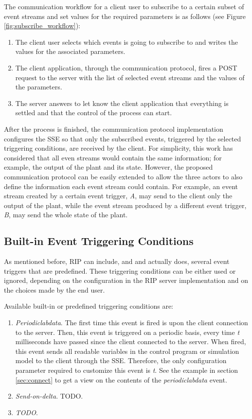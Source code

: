 The communication workflow for a client user to subscribe to a certain subset of event streams and set values for the required parameters is as follows (see Figure \ref{fig:subscribe_workflow}):

\begin{enumerate}
	\item The client user selects which events is going to subscribe to and writes the values for the associated parameters. 
	\item The client application, through the communication protocol, fires a POST request to the server with the list of selected event streams and the values of the parameters.
	\item The server answers to let know the client application that everything is settled and that the control of the process can start.
\end{enumerate}

After the process is finished, the communication protocol implementation configures the SSE so that only the subscribed events, triggered by the selected triggering conditions, are received by the client. For simplicity, this work has considered that all even streams would contain the same information; for example, the output of the plant and its state. However, the proposed communication protocol can be easily extended to allow the three actors to also define the information each event stream could contain. For example, an event stream created by a certain event trigger, \textit{A}, may send to the client only the output of the plant, while the event stream produced by a different event trigger, \textit{B}, may send the whole state of the plant.

\subsection{Built-in Event Triggering Conditions}
As mentioned before, RIP can include, and and actually does, several event triggers that are predefined. These triggering conditions can be either used or ignored, depending on the configuration in the RIP server implementation and on the choices made by the end user.

Available built-in or predefined triggering conditions are:

\begin{enumerate}
	\item \textit{Periodiclabdata}. The first time this event is fired is upon the client connection to the server. Then, this event is triggered on a periodic basis, every time \textit{t} milliseconds have passed since the client connected to the server. When fired, this event sends all readable variables in the control program or simulation model to the client through the SSE. Therefore, the only configuration parameter required to customize this event is \textit{t}. See the example in section \ref{sec:connect} to get a view on the contents of the \textit{periodiclabdata} event.
	\item \textit{Send-on-delta}. TODO.
	\item \textit{TODO}.
\end{enumerate}


